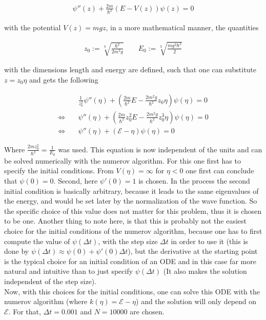 \documentclass[12pt, a4paper]{article}
\begin{document}
  \begin{align}
    \psi''(z) + \frac{2 m}{\hbar^2} (E - V(z)) \psi(z) = 0
  \end{align}

  \noindent
  with the potential $V(z) = m g z$, in a more mathematical manner, the quantities

  \begin{align}
    z_0 := \sqrt[3]{\frac{\hbar^2}{2 m^2 g}} \qquad E_0 := \sqrt[3]{\frac{m g^2 \hbar^2}{2}}
  \end{align}

  \noindent
  with the dimensions length and energy are defined, such that one can substitute $z = z_0 \eta$ and gets the following

  \begin{align}
    & \frac{1}{z_0^2} \psi''(\eta) + \left(\frac{2 m}{\hbar^2} E - \frac{2 m^2 g}{\hbar^2} z_0 \eta \right) \psi(\eta) = 0
    \nonumber \\
    \Leftrightarrow \quad & \psi''(\eta) + \left( \frac{2 m}{\hbar^2} z_0^2 E - \frac{2 m^2 g}{\hbar^2} z_0^3 \eta \right) \psi(\eta) = 0 \nonumber \\
    \Leftrightarrow \quad & \psi''(\eta) + \left( \mathcal{E} - \eta \right) \psi(\eta) = 0
    \label{eq_schrd}
  \end{align}
 

  \noindent
  Where $\frac{2 m z_0^2}{\hbar^2} = \frac{1}{E_0}$ was used. This equation is now independent of the units and can be solved numerically with the numerov algorithm. For this one first has to specify the initial conditions. From $V(\eta) = \infty$ for $\eta < 0$ one first can conclude that $\psi(0) = 0$. Second, here $\psi'(0) = 1$ is chosen. In the process the second initial condition is basically arbitrary, because it leads to the same eigenvalues of the energy, and would be set later by the normalization of the wave function. So the specific choice of this value does not matter for this problem, thus it is chosen to be one. Another thing to note here, is that this is probably not the easiest choice for the initial conditions of the numerov algorithm, because one has to first compute the value of $\psi(\Delta t)$, with the step size $\Delta t$ in order to use it (this is done by $\psi(\Delta t) \approx \psi(0) + \psi'(0) \Delta t$), but the derivative at the starting point is the typical choice for an initial condition of an ODE and in this case far more natural and intuitive than to just specify $\psi(\Delta t)$ (It also makes the solution independent of the step size).\\
  Now, with this choices for the initial conditions, one can solve this ODE with the numerov algorithm (where $k(\eta) = \mathcal{E} - \eta$) and the solution will only depend on $\mathcal{E}$. For that, $\Delta t = 0.001$ and $N = 10000$ are chosen. \\
\end{document}
